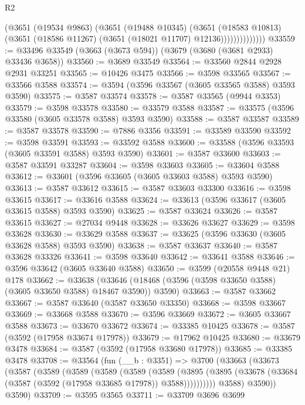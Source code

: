 \begin{lexlean}{R2}
\begin{coremodule}
                      (@3651
                        (@19534 @9863)
                        (@3651
                          (@19488 @10345)
                          (@3651
                            (@18583 @10813)
                            (@3651 (@18586 @11267) (@3651 (@18021 @11707) @12136))))))))))))))
@33559 := @33496 @33549 (@3663 (@3673 @594)) (@3679 (@3680 (@3681 @2933) @33436 @3658))
@33560 := @3689 @33549
@33564 := @33560 @2844 @2928 @2931 @33251
@33565 := @10426 @3475
@33566 := @3598 @33565
@33567 := @33566 @3588
@33574 := @3594 (@3596 @33567 (@3605 @33565 @3588) @3593 @3590)
@33575 := @3587 @33574
@33578 := @3587 @33565 (@9944 @3353)
@33579 := @3598 @33578
@33580 := @33579 @3588
@33587 := @33575 (@3596 @33580 (@3605 @33578 @3588) @3593 @3590)
@33588 := @3587 @33587
@33589 := @3587 @33578
@33590 := @7886 @3356
@33591 := @33589 @33590
@33592 := @3598 @33591
@33593 := @33592 @3588
@33600 := @33588 (@3596 @33593 (@3605 @33591 @3588) @3593 @3590)
@33601 := @3587 @33600
@33603 := @3587 @33591 @33287
@33604 := @3598 @33603
@33605 := @33604 @3588
@33612 := @33601 (@3596 @33605 (@3605 @33603 @3588) @3593 @3590)
@33613 := @3587 @33612
@33615 := @3587 @33603 @33300
@33616 := @3598 @33615
@33617 := @33616 @3588
@33624 := @33613 (@3596 @33617 (@3605 @33615 @3588) @3593 @3590)
@33625 := @3587 @33624
@33626 := @3587 @33615
@33627 := @27034 @9448
@33628 := @33626 @33627
@33629 := @3598 @33628
@33630 := @33629 @3588
@33637 := @33625 (@3596 @33630 (@3605 @33628 @3588) @3593 @3590)
@33638 := @3587 @33637
@33640 := @3587 @33628 @33326
@33641 := @3598 @33640
@33642 := @33641 @3588
@33646 := @3596 @33642 (@3605 @33640 @3588)
@33650 := @3599 (@20558 @9448 @21) @178
@33662 := @33638
    (@33646 (@18468 (@3596 (@3598 @33650 @3588) (@3605 @33650 @3588) @18467 @3590)) @3590)
@33663 := @3587 @33662
@33667 := @3587 @33640 (@3587 @33650 @33350)
@33668 := @3598 @33667
@33669 := @33668 @3588
@33670 := @3596 @33669
@33672 := @3605 @33667 @3588
@33673 := @33670 @33672
@33674 := @33385 @10425
@33678 := @3587 (@3592 (@17958 @33674 @17978))
@33679 := @17962 @10425
@33680 := @33679 @3478
@33684 := @3587 (@3592 (@17958 @33680 @17978))
@33685 := @33385 @3478
@33708 := @33564
    (fun (__b : @3351) =>
    @3700
      (@33663
        (@33673
          (@3587
            (@3589
              (@3589
                (@3589
                  (@3589
                    (@3589
                      (@3895
                        (@3895 (@33678 (@33684 (@3587 (@3592 (@17958 @33685 @17978)) @3588))))))))))
            @3588)
          @3590))
      @3590)
@33709 := @3595 @3565
@33711 := @33709 @3696 @3699

\end{coremodule}
\end{lexlean}
